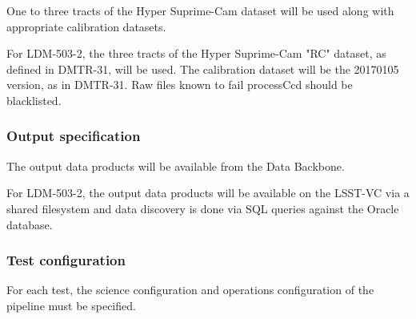 One to three tracts of the Hyper Suprime-Cam dataset will be used along with appropriate calibration datasets.

For LDM-503-2, the three tracts of the Hyper Suprime-Cam "RC" dataset, as defined in DMTR-31, will be used.
The calibration dataset will be the 20170105 version, as in DMTR-31.   Raw files known to fail processCcd 
should be blacklisted.

\subsubsection{Output specification}

The output data products will be available from the Data Backbone.

For LDM-503-2, the output data products will be available on the LSST-VC via a shared filesystem and data discovery is done via SQL queries against the Oracle database.


\subsubsection{Test configuration}\label{sec:configuration}

For each test, the science configuration and operations configuration of the pipeline must be specified.

